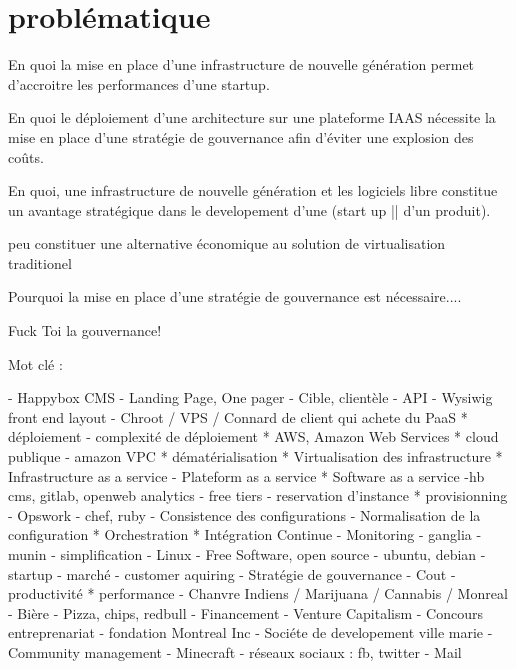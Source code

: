 \documentclass[11pt, a4paper ]{report}
\begin{document}
		\section{problématique} %

			En quoi la mise en place d'une infrastructure de nouvelle génération permet d'accroitre les performances d'une startup.

			En quoi le déploiement d'une architecture sur une plateforme IAAS nécessite la mise en place d'une stratégie de gouvernance afin d'éviter une explosion des coûts.

			En quoi, une infrastructure de nouvelle génération et les logiciels libre constitue un avantage stratégique dans le developement d'une (start up || d'un produit).

			peu constituer une alternative économique au solution de virtualisation traditionel

			Pourquoi la mise en place d'une stratégie de gouvernance est nécessaire....

			Fuck Toi la gouvernance!

			Mot clé :

				- Happybox CMS
					- Landing Page, One pager
					- Cible, clientèle
					- API
					- Wysiwig front end layout
					- Chroot / VPS / Connard de client qui achete du PaaS
				* déploiement
					- complexité de déploiement
					* AWS, Amazon Web Services
						* cloud publique
							- amazon VPC
						* dématérialisation
						* Virtualisation des infrastructure						* Infrastructure as a service
							- Plateform as a service
							* Software as a service
								-hb cms, gitlab, openweb analytics
						- free tiers
						- reservation d'instance
					* provisionning
						- Opswork
							- chef, ruby
							- Consistence des configurations
							- Normalisation de la configuration
						* Orchestration
						* Intégration Continue
					- Monitoring
						- ganglia
						- munin
					- simplification
					- Linux
						- Free Software, open source
						- ubuntu, debian
				- startup
					- marché 
					- customer aquiring
					- Stratégie de gouvernance
					- Cout
					- productivité
					* performance
					- Chanvre Indiens / Marijuana / Cannabis / Monreal
					- Bière 
					- Pizza, chips, redbull
					- Financement 
						- Venture Capitalism
						- Concours entreprenariat
							- fondation Montreal Inc
							- Sociéte de developement ville marie
					- Community management
						- Minecraft
						- réseaux sociaux : fb, twitter
						- Mail
			
\end{document}
